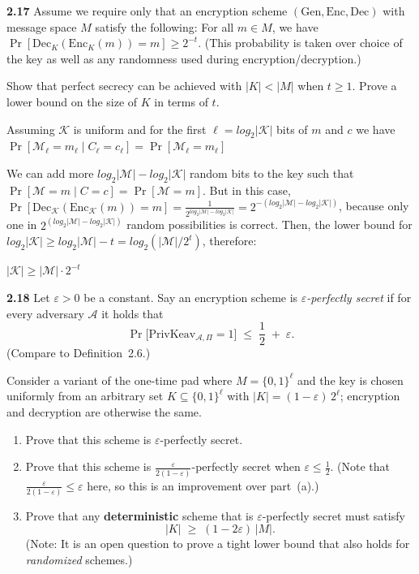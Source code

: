 \newpage
\noindent
\textbf{2.17} \hspace{1em} Assume we require only that an encryption scheme \( (\text{Gen}, \text{Enc}, \text{Dec}) \) with message space \( M \) satisfy the following: For all \( m \in M \), we have $\Pr[\text{Dec}_K(\text{Enc}_K(m)) = m] \geq 2^{-t}.$ (This probability is taken over choice of the key as well as any randomness used during encryption/decryption.)

Show that perfect secrecy can be achieved with \( |K| < |M| \) when \( t \geq 1 \). Prove a lower bound on the size of \( K \) in terms of \( t \).

\vspace{1em}

Assuming $\mathcal{K}$ is uniform and for the first  $\ell = log_2|\mathcal{K}|$ bits of $m$ and $c$ we have $\Pr[\mathcal{M}_\ell = m_\ell \mid C_\ell = c_\ell] = \Pr[\mathcal{M}_\ell = m_\ell]$

We can add more $log_2|\mathcal{M}| - log_2|\mathcal{K}|$ random bits to the key such that $\Pr[\mathcal{M} =m \mid C = c] = \Pr[\mathcal{M} = m]$. But in this case, $\Pr[\text{Dec}_\mathcal{K}(\text{Enc}_\mathcal{K}(m)) = m] = \frac{1}{2^{log_2|\mathcal{M}|-log_2|\mathcal{K}|}}= 2^{-(log_2|\mathcal{M}| - log_2|\mathcal{K}|)}$, because only one in $2^{(log_2|\mathcal{M}| - log_2|\mathcal{K}|)}$ random possibilities is correct.
Then, the lower bound for $log_2|\mathcal{K}| \ge log_2|\mathcal{M}| - t = log_2(|\mathcal{M}| / 2^t)$, therefore:

$|\mathcal{K}| \ge |\mathcal{M}| \cdot 2^{-t}$


\newpage
\noindent
\textbf{2.18} \hspace{1em} Let $\varepsilon>0$ be a constant.  
Say an encryption scheme is \emph{$\varepsilon$-perfectly secret} if for every adversary $\mathcal{A}$ it holds that
\[
\Pr\bigl[\text{PrivKeav}_{\mathcal{A},\Pi}=1\bigr] \;\le\;
\frac12 \;+\; \varepsilon .
\]
(Compare to Definition~2.6.)  

Consider a variant of the one-time pad where $M=\{0,1\}^\ell$ and the key is chosen uniformly from an arbitrary
set $K\subseteq\{0,1\}^\ell$ with $|K|=(1-\varepsilon)\,2^\ell$; encryption and decryption are otherwise the same.

\begin{enumerate}
	\item[(a)] Prove that this scheme is $\varepsilon$-perfectly secret.
	\item[(b)] Prove that this scheme is
	$\displaystyle \frac{\varepsilon}{2(1-\varepsilon)}$-perfectly secret when $\varepsilon\le \tfrac12$.  
	(Note that $\tfrac{\varepsilon}{2(1-\varepsilon)}\le\varepsilon$ here, so this is an improvement over part~(a).)
	\item[(c)] Prove that any \textbf{deterministic} scheme that is $\varepsilon$-perfectly secret must satisfy
	\[
	|K| \;\ge\; (1-2\varepsilon)\,|M|.
	\]
	(Note: It is an open question to prove a tight lower bound that also holds for \emph{randomized} schemes.)
\end{enumerate}

